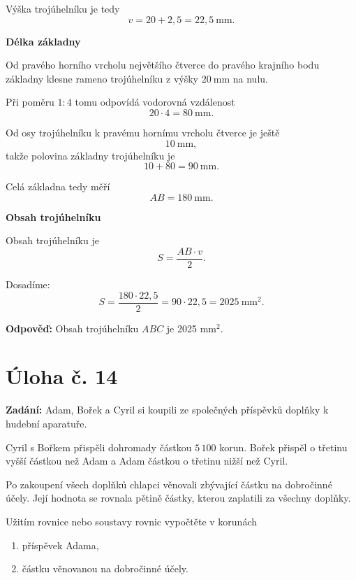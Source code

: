 \documentclass[12pt,a4paper]{article}
\begin{document}
Výška trojúhelníku je tedy
\[
v = 20+2{,}5=22{,}5\ \mathrm{mm}.
\]

\bigskip

\textbf{Délka základny}

Od pravého horního vrcholu největšího čtverce do pravého krajního bodu základny klesne rameno trojúhelníku z výšky \(20\ \mathrm{mm}\) na nulu.

Při poměru \(1:4\) tomu odpovídá vodorovná vzdálenost
\[
20\cdot 4=80\ \mathrm{mm}.
\]

Od osy trojúhelníku k pravému hornímu vrcholu čtverce je ještě
\[
10\ \mathrm{mm},
\]
takže polovina základny trojúhelníku je
\[
10+80=90\ \mathrm{mm}.
\]

Celá základna tedy měří
\[
AB=180\ \mathrm{mm}.
\]

\bigskip

\textbf{Obsah trojúhelníku}

Obsah trojúhelníku je
\[
S=\frac{AB\cdot v}{2}.
\]

Dosadíme:
\[
S=\frac{180\cdot 22{,}5}{2}=90\cdot 22{,}5=2025\ \mathrm{mm}^2.
\]

\bigskip

\textbf{Odpověď:}  
Obsah trojúhelníku \(ABC\) je 2025 \(\mathrm{mm}^2\).


\newpage
\section*{Úloha č. 14}

\textbf{Zadání:}  
Adam, Bořek a Cyril si koupili ze společných příspěvků doplňky k hudební aparatuře.

Cyril s Bořkem přispěli dohromady částkou \(5\,100\) korun. Bořek přispěl o třetinu vyšší částkou než Adam a Adam částkou o třetinu nižší než Cyril.

Po zakoupení všech doplňků chlapci věnovali zbývající částku na dobročinné účely. Její hodnota se rovnala pětině částky, kterou zaplatili za všechny doplňky.

Užitím rovnice nebo soustavy rovnic vypočtěte v korunách
\begin{enumerate}
    \item[4.1] příspěvek Adama,
    \item[4.2] částku věnovanou na dobročinné účely.
\end{enumerate}

\bigskip
\end{document}

